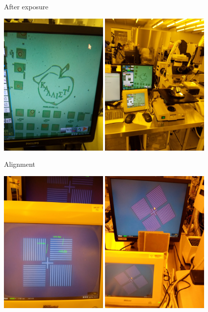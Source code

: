 \documentclass[9pt]{beamer}
\begin{document}
\begin{frame}{After exposure}
\begin{center}
\includegraphics[width=0.4\textwidth]{images/20181210_125830_Burst01.jpg}
\includegraphics[width=0.4\textwidth]{images/20181210_125845.jpg}
\end{center}
\end{frame}

\begin{frame}{Alignment}
\begin{center}
\includegraphics[width=0.4\textwidth]{images/20181211_125918.jpg}
\includegraphics[width=0.4\textwidth]{images/20181211_161801_Burst01.jpg}
\end{center}
\end{frame}
\end{document}
